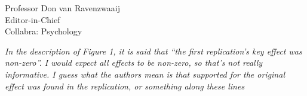 \documentclass{stanfordletter}
\newcommand{\theysaid}[1]{\begin{leftbar} \noindent 
		\textsl{ #1}\end{leftbar}}
\newcommand{\revised}[1]{\begin{quote}	#1 \end{quote}}
\begin{document}
\begin{letter}{Professor Don van Ravenzwaaij \\ Editor-in-Chief \\ Collabra: Psychology }
	
		
		
		
	
	
	\theysaid{In the description of Figure 1, it is said that “the first replication’s key effect was non-zero”. I would expect all effects to be non-zero, so that’s not really informative. I guess what the authors mean is that supported for the original effect was found in the replication, or something along these lines}
	

\end{letter}
\end{document}

